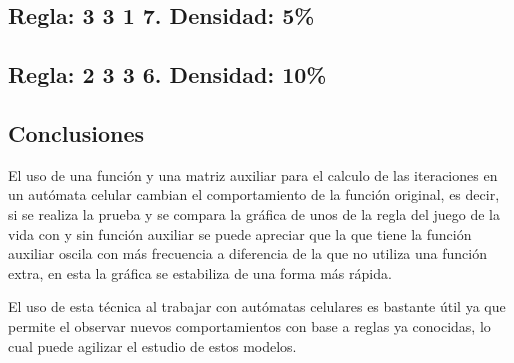 \documentclass[a4paper,12pt]{article}
\begin{document}
\subsection{Regla: 3 3 1 7. Densidad: 5\%}
\subsection{Regla: 2 3 3 6. Densidad: 10\%}

\subsection{Conclusiones}
El uso de una función y una matriz auxiliar para el calculo de las iteraciones en un autómata celular cambian el comportamiento de la función original, es decir, si se realiza la prueba y se compara la gráfica de unos de la regla del juego de la vida con y sin función auxiliar se puede apreciar que la que tiene la función auxiliar oscila con más frecuencia a diferencia de la que no utiliza una función extra, en esta la gráfica se estabiliza de una forma más rápida.

El uso de esta técnica al trabajar con autómatas celulares es bastante útil ya que permite el observar nuevos comportamientos con base a reglas ya conocidas, lo cual puede agilizar el estudio de estos modelos.



\end{document}
